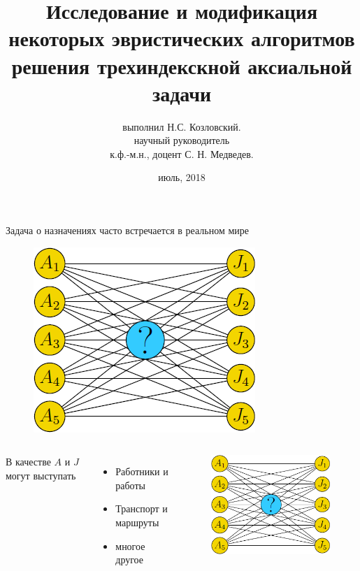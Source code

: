 \documentclass[12pt]{beamer}
\author[Н.С. Козловский]{выполнил Н.С. Козловский.\\[1ex]  {\small научный руководитель \\ к.ф.-м.н., доцент С. Н. Медведев.}}
\title{Исследование и модификация некоторых эвристических алгоритмов решения трехиндекскной аксиальной задачи}
\institute{ВГУ, факультет ПММ \\ кафедра ВМиПИТ}
\date{июль, 2018}
\begin{document}
\begin{frame}
\titlepage
\end{frame}

\begin{frame}
Задача о назначениях часто встречается в реальном мире

\begin{figure}
\includegraphics[scale=0.5]{assignmentproblem.png}
\end{figure}
\end{frame}

\begin{frame}
\begin{columns}
В качестве $A$ и $J$ могут выступать
\begin{itemize}
\item Работники и работы
\item Транспорт и маршруты
\item многое другое
\end{itemize}
\begin{figure}
\includegraphics[scale=0.5]{assignmentproblem.png}
\end{figure}
\end{columns}
\end{frame}
\end{document}
